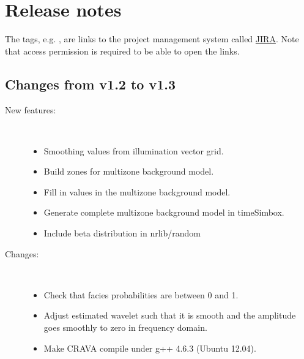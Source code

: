\chapter{Release notes}
The tags, e.g. , are links to the \crava project management
system called
\href{http://www.atlassian.com/software/jira/}{JIRA}.
 Note that access permission is
required to be able to open the links.

\section{Changes from v1.2 to v1.3}

\begin{description}
\item [New features:] \mbox{ }
  \begin{itemize}
    \item Smoothing values from illumination vector grid. 
    \item Build zones for multizone background model. 
    \item Fill in values in the multizone background model. 
    \item Generate complete multizone background model in timeSimbox. 
    \item Include beta distribution in nrlib/random 
 \end{itemize}

\item [Changes:] \mbox{ }
  \begin{itemize}
   \item Check that facies probabilities are between 0 and 1. 
   \item Adjust estimated wavelet such that it is smooth and the amplitude goes smoothly to zero in frequency domain. 
   \item Make CRAVA compile under g++ 4.6.3 (Ubuntu 12.04). 
 \end{itemize}


\end{description}
